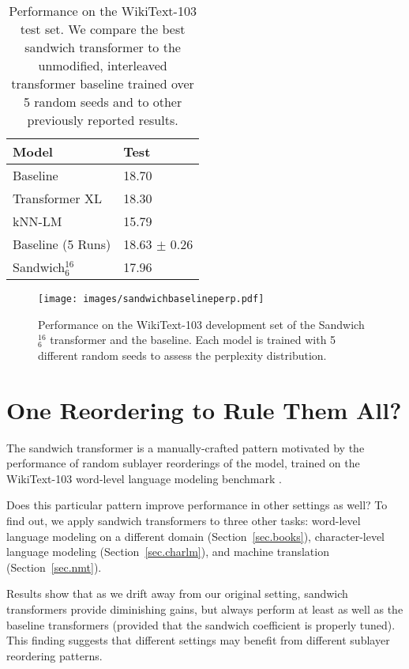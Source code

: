 \documentclass[11pt,a4paper]{article}
\begin{document}
\begin{table}[t]
\centering
\small
\begin{tabular}{@{}ll@{}}
\toprule
\textbf{Model}   
& \textbf{Test}   \\
\midrule
Baseline \cite{baevski2018adaptive} & 18.70 \\
Transformer XL \cite{transformerXL} & 18.30 \\
kNN-LM \cite{urvashi} & 15.79 \\
\midrule
Baseline (5 Runs)  
& 18.63 $\pm$ 0.26 \\
Sandwich$^{16}_6$ 
& 17.96 \\
\bottomrule
\end{tabular}
\caption{Performance on the WikiText-103 test set. We compare the best sandwich transformer to the unmodified, interleaved transformer baseline \cite{baevski2018adaptive} trained over 5 random seeds and to other previously reported results.}
\label{tab.sandwichtest}
\end{table}

\begin{figure}[h]
\centering
\texttt{[image: images/sandwichbaselineperp.pdf]}
\caption{Performance on the WikiText-103 development set of the Sandwich$^{16}_6$ transformer and the baseline. Each model is trained with 5 different random seeds to assess the perplexity distribution.}
\label{fig:sandwichdist}
\end{figure}


 \section{One Reordering to Rule Them All?}

The sandwich transformer is a manually-crafted pattern motivated by the performance of random sublayer reorderings of the \citet{baevski2018adaptive} model, trained on the WikiText-103 word-level language modeling benchmark \cite{merity2016pointer}.

Does this particular pattern improve performance in other settings as well?
To find out, we apply sandwich transformers to three other tasks:  word-level language modeling on a different domain (Section~\ref{sec.books}), character-level language modeling (Section~\ref{sec.charlm}), and machine translation (Section~\ref{sec.nmt}). 

Results show that as we drift away from our original setting, sandwich transformers provide diminishing gains, but always perform at least as well as the baseline transformers (provided that the sandwich coefficient is properly tuned).
This finding suggests that different settings may benefit from different sublayer reordering patterns.
\end{document}

